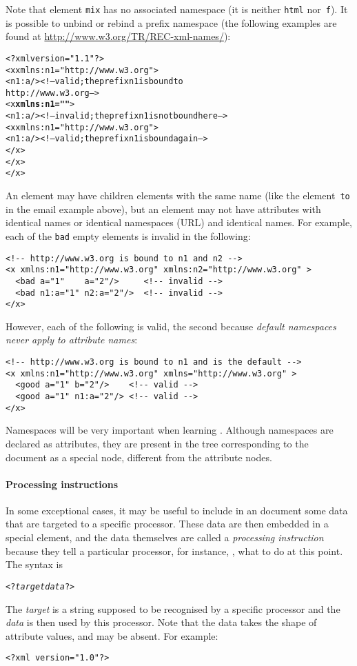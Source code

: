 Note that element \texttt{mix} has no associated namespace (it is
neither \texttt{html} nor~\texttt{f}). It is possible to unbind or
rebind a prefix namespace (the following examples are found at
\url{http://www.w3.org/TR/REC-xml-names/}):
\begin{alltt}
<?xml version="1.1"?>
<x xmlns:n1="http://www.w3.org">
  <n1:a/> <!-- valid; the prefix n1 is bound to
               http://www.w3.org -->
    <x \textbf{xmlns:n1=""}>
      <n1:a/> <!-- invalid; the prefix n1 is not bound here -->
      <x xmlns:n1="http://www.w3.org">
        <n1:a/> <!-- valid; the prefix n1 is bound again -->
      </x>
   </x>
</x>
\end{alltt}



\noindent An element may have children elements with the same name
(like the element~\texttt{to} in the email example above), but an
element may not have attributes with identical names or identical
namespaces (URL) and identical names. For example, each of the
\texttt{bad} empty elements is invalid in the following:
\begin{verbatim}
<!-- http://www.w3.org is bound to n1 and n2 -->
<x xmlns:n1="http://www.w3.org" xmlns:n2="http://www.w3.org" >
  <bad a="1"    a="2"/>     <!-- invalid -->
  <bad n1:a="1" n2:a="2"/>  <!-- invalid -->
</x>
\end{verbatim}
However, each of the following is valid, the second because
\emph{default namespaces never apply to attribute names}:
\begin{verbatim}
<!-- http://www.w3.org is bound to n1 and is the default -->
<x xmlns:n1="http://www.w3.org" xmlns="http://www.w3.org" >
  <good a="1" b="2"/>    <!-- valid -->
  <good a="1" n1:a="2"/> <!-- valid -->
</x>
\end{verbatim}
Namespaces will be very important when learning \XSLT. Although
namespaces are declared as attributes, they are present in the \XML
tree corresponding to the document as a special node, different from
the attribute nodes.

\paragraph{Processing instructions}

In some exceptional cases, it may be useful to include in an \XML
document some data that are targeted to a specific \XML
processor. These data are then embedded in a special element, and the
data themselves are called a \emph{processing instruction} because
they tell a particular processor, for instance, \Saxon, what to do at
this point. The syntax is
\begin{alltt}
<?\textit{target} \textit{data}?>
\end{alltt}
The \emph{target} is a string supposed to be recognised by a specific
\XML processor and the \emph{data} is then used by this
processor. Note that the data takes the shape of attribute values, and
may be absent. For example:
\begin{verbatim}
<?xml version="1.0"?>
\end{verbatim}

